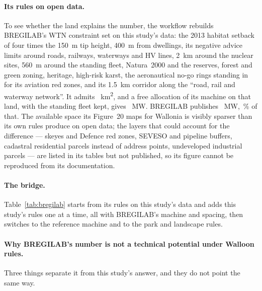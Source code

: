 \documentclass[11pt,a4paper]{article}
\begin{document}
\paragraph{Its rules on open data.} To see whether the land explains the
number, the workflow rebuilds BREGILAB's WTN constraint set on this study's
data: the 2013 habitat setback of four times the \SI{150}{\metre} tip height,
\SI{400}{\metre} from dwellings, its negative advice limits around roads,
railways, waterways and HV lines, \SI{2}{\kilo\metre} around the nuclear sites,
\SI{560}{\metre} around the standing fleet, Natura~2000 and the reserves, forest
and green zoning, heritage, high-risk karst, the aeronautical no-go rings
standing in for its aviation red zones, and its \SI{1.5}{\kilo\metre} corridor
along the ``road, rail and waterway network''. It admits
\BregEmuArea{}~\si{\square\kilo\metre}, and a free allocation of its machine on
that land, with the standing fleet kept, gives \BregEmuMW{}~MW. BREGILAB
publishes \BregTotal{}~MW, \BregReportedShare{}\,\% of that. The available
space its Figure~20 maps for Wallonia is visibly sparser than its own rules
produce on open data; the layers that could account for the difference ---
skeyes and Defence red zones, SEVESO and pipeline buffers, cadastral
residential parcels instead of address points, undeveloped industrial parcels ---
are listed in its tables but not published, so its figure cannot be reproduced
from its documentation.

\paragraph{The bridge.} Table~\ref{tab:bregilab} starts from its rules on this
study's data and adds this study's rules one at a time, all with BREGILAB's
machine and spacing, then switches to the reference machine and to the park and
landscape rules.

\begin{table}[htbp]\centering\small
\caption{Bridge from BREGILAB's rules to this study's answer. Upper block: free
allocation of BREGILAB's V112 (3.3~MW, 560~m), each row adding one of this
study's rules. Lower block: the reference machine and this study's placement
rules.}
\label{tab:bregilab}

\end{table}

\paragraph{Why BREGILAB's number is not a technical potential under Walloon
rules.} Three things separate it from this study's answer, and they do not
point the same way.
\end{document}

